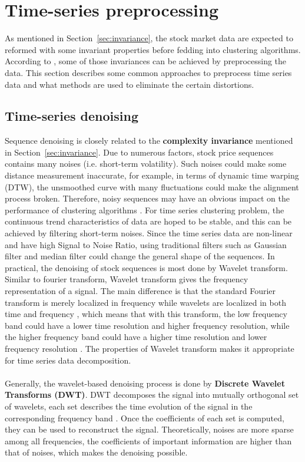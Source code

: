 \section{Time-series preprocessing}
As mentioned in Section~\ref{sec:invariance}, the stock market data are expected to reformed with some invariant properties before fedding into clustering algorithms. According to \cite{paparrizos2015k}, some of those invariances can be achieved by preprocessing the data. This section describes some common approaches to preprocess time series data and what methods are used to eliminate the certain distortions.

\subsection{Time-series denoising}
\label{sec:denosing}
Sequence denoising is closely related to the \textbf{complexity invariance} mentioned in Section~\ref{sec:invariance}. Due to numerous factors, stock price sequences contains many noises (i.e. short-term volatility). Such noises could make some distance measurement inaccurate, for example, in terms of dynamic time warping (DTW), the unsmoothed curve with many fluctuations could make the alignment process broken. Therefore, noisy sequences may have an obvious impact on the performance of clustering algorithms \cite{zhang2011novel}. For time series clustering problem, the continuous trend characteristics of data are hoped to be stable, and this can be achieved by filtering short-term noises. Since the time series data are non-linear and have high Signal to Noise Ratio, using traditional filters such as Gaussian filter and median filter could change the general shape of the sequences. In practical, the denoising of stock sequences is most done by Wavelet transform. Similar to fourier transform, Wavelet transform gives the frequency representation of a signal. The main difference is that the standard Fourier transform is merely localized in frequency while wavelets are localized in both time and frequency \cite{shensa1992discrete}, which means that with this transform, the low frequency band could have a lower time resolution and higher frequency resolution, while the higher frequency band could have a higher time resolution and lower frequency resolution \cite{wu2021hybrid}. The properties of Wavelet transform makes it appropriate for time series data decomposition.\\
\\Generally, the wavelet-based denoising process is done by \textbf{Discrete Wavelet Transforms (DWT)}. DWT  decomposes the signal into mutually orthogonal set of wavelets, each set describes the time evolution of the signal in the corresponding frequency band \cite{altunkaynak2016comparison}. Once the coefficients of each set is computed, they can be used to reconstruct the signal. Theoretically, noises are more sparse among all frequencies, the coefficients of important information are higher than that of noises, which makes the denoising possible. \\
